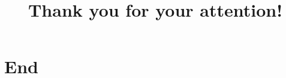 \documentclass[11pt,t,usepdftitle=false,aspectratio=169]{beamer}
\begin{document}
	
	
	
	
	
	
	\title{Thank you for your attention!}
	\subtitle{}
	\section{End}
	
\end{document}
